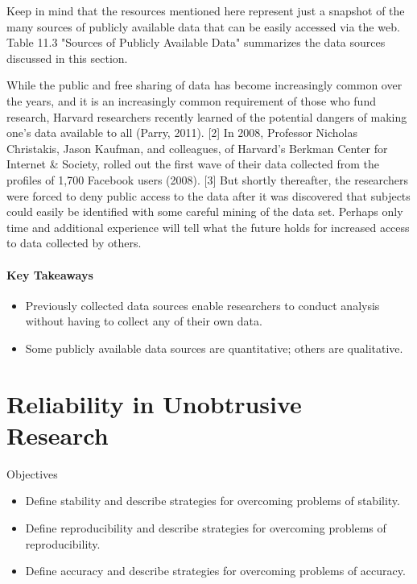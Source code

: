 Keep in mind that the resources mentioned here represent just a snapshot of the many sources of publicly available data that can be easily accessed via the web. Table 11.3 "Sources of Publicly Available Data" summarizes the data sources discussed in this section.


While the public and free sharing of data has become increasingly common over the years, and it is an increasingly common requirement of those who fund research, Harvard researchers recently learned of the potential dangers of making one’s data available to all (Parry, 2011). [2] In 2008, Professor Nicholas Christakis, Jason Kaufman, and colleagues, of Harvard’s Berkman Center for Internet \& Society, rolled out the first wave of their data collected from the profiles of 1,700 Facebook users (2008). [3] But shortly thereafter, the researchers were forced to deny public access to the data after it was discovered that subjects could easily be identified with some careful mining of the data set. Perhaps only time and additional experience will tell what the future holds for increased access to data collected by others.

\paragraph{Key Takeaways}

\begin{itemize}
	\setlength{\itemsep}{0pt}
	\setlength{\parskip}{0pt}
	\setlength{\parsep}{0pt}
	
	\item Previously collected data sources enable researchers to conduct analysis without having to collect any of their own data.
	\item Some publicly available data sources are quantitative; others are qualitative.
	
\end{itemize}

\section{Reliability in Unobtrusive Research}

\begin{center}
	\begin{objbox}{Objectives}
		\begin{itemize}
			\setlength{\itemsep}{0pt}
			\setlength{\parskip}{0pt}
			\setlength{\parsep}{0pt}
			
			\item Define stability and describe strategies for overcoming problems of stability.
			\item Define reproducibility and describe strategies for overcoming problems of reproducibility.
			\item Define accuracy and describe strategies for overcoming problems of accuracy.
			
		\end{itemize}
	\end{objbox}
\end{center}

